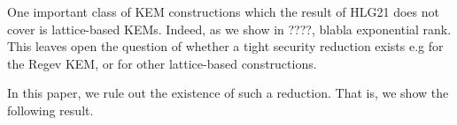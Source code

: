 One important class of KEM constructions which the result of HLG21 does not cover is lattice-based KEMs.
Indeed, as we show in ????, blabla exponential rank.
This leaves open the question of whether a tight security reduction exists e.g for the Regev KEM,
or for other lattice-based constructions.

In this paper, we rule out the existence of such a reduction.
That is, we show the following result.







